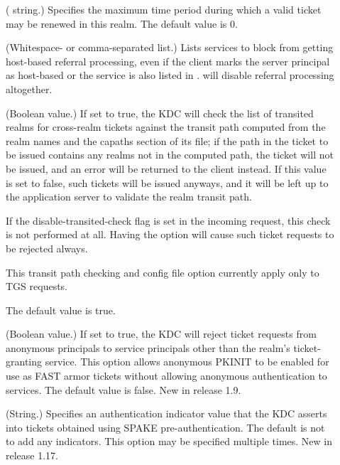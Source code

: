 \documentclass[letterpaper,10pt,english]{sphinxmanual}
\begin{document}
\begin{description}
\item[{}] \leavevmode
( string.)  Specifies the maximum time period
during which a valid ticket may be renewed in this realm.
The default value is 0.

\item[{}] \leavevmode
(Whitespace- or comma-separated list.)  Lists services to block
from getting host-based referral processing, even if the client
marks the server principal as host-based or the service is also
listed in .   will
disable referral processing altogether.

\item[{}] \leavevmode
(Boolean value.)  If set to true, the KDC will check the list of
transited realms for cross-realm tickets against the transit path
computed from the realm names and the capaths section of its
{\hyperref[\detokenize{admin/conf_files/krb5_conf:krb5-conf-5}]{}} file; if the path in the ticket to be issued
contains any realms not in the computed path, the ticket will not
be issued, and an error will be returned to the client instead.
If this value is set to false, such tickets will be issued
anyways, and it will be left up to the application server to
validate the realm transit path.

If the disable-transited-check flag is set in the incoming
request, this check is not performed at all.  Having the
 option will cause such ticket requests to
be rejected always.

This transit path checking and config file option currently apply
only to TGS requests.

The default value is true.

\item[{}] \leavevmode
(Boolean value.)  If set to true, the KDC will reject ticket
requests from anonymous principals to service principals other
than the realm’s ticket-granting service.  This option allows
anonymous PKINIT to be enabled for use as FAST armor tickets
without allowing anonymous authentication to services.  The
default value is false.  New in release 1.9.

\item[{}] \leavevmode
(String.)  Specifies an authentication indicator value that the
KDC asserts into tickets obtained using SPAKE pre-authentication.
The default is not to add any indicators.  This option may be
specified multiple times.  New in release 1.17.


\end{description}
\end{document}
